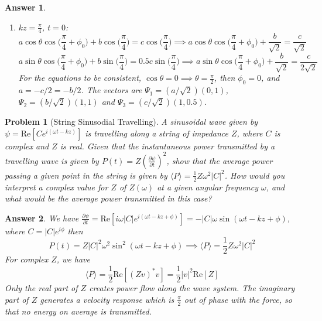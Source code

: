 \documentclass[a4paper]{article}
\newtheorem{ans}{Answer}[section]
\theoremstyle{new}
\newtheorem{qns}{Problem}[section]
\begin{document}
\begin{ans}
\begin{enumerate}[label=(\alph*)]
\begin{enumerate}[label=(\roman*)]
\item $kz=\frac{\pi}{4}$, $t=0$:
$$a\cos\theta\cos\bigg(\frac{\pi}{4}+\phi_0\bigg)+b\cos\bigg(\frac{\pi}{4}\bigg)=c\cos\bigg(\frac{\pi}{4}\bigg)\implies a\cos\theta\cos\bigg(\frac{\pi}{4}+\phi_0\bigg)+\frac{b}{\sqrt{2}}=\frac{c}{\sqrt{2}}$$
$$a\sin\theta\cos\bigg(\frac{\pi}{4}+\phi_0\bigg)+b\sin\bigg(\frac{\pi}{4}\bigg)=0.5c\sin\bigg(\frac{\pi}{4}\bigg)\implies a\sin\theta\cos\bigg(\frac{\pi}{4}+\phi_0\bigg)+\frac{b}{\sqrt{2}}=\frac{c}{2\sqrt{2}}$$
For the equations to be consistent, $\cos\theta=0\implies\theta=\frac{\pi}{2}$, then $\phi_0=0$, and $a=-c/2=-b/2$. The vectors are $\Psi_1=(a/\sqrt{2})(0,1)$, $\Psi_2=(b/\sqrt{2})(1,1)$ and $\Psi_3=(c/\sqrt{2})(1,0.5)$. 
\end{enumerate}
\end{enumerate}
\end{ans}
\begin{qns}[String Sinusodial Travelling]
A sinusoidal wave given by   $\psi=\text{Re}[Ce^{i(\omega t-kz)}]$ is travelling along a string of impedance $Z$, where $C$ is complex and $Z$ is real. Given that the instantaneous power transmitted by a travelling wave is given by $P(t)=Z(\frac{\partial\psi}{\partial t})^2$, show that the average power passing a given point in the string is given by $\langle P\rangle=\frac{1}{2}Z\omega^2|C|^2$. How would you interpret a complex value for $Z$ of $Z(\omega)$ at a given angular frequency $\omega$, and what would be the average power transmitted in this case?
\end{qns}
\begin{ans}
We have $\frac{\partial\psi}{\partial t}=\text{Re}[i\omega |C|e^{i(\omega t-kz+\phi)}]=-|C|\omega\sin(\omega t-kz+\phi)$, where $C=|C|e^{i\phi}$ then
$$P(t)=Z|C|^2\omega^2\sin^2(\omega t-kz+\phi)\implies \langle P\rangle=\frac{1}{2}Z\omega^2|C|^2$$
For complex $Z$, we have
$$\langle P\rangle=\frac{1}{2}\text{Re}[(Zv)^*v]=\frac{1}{2}|v|^2\text{Re}[Z]$$
Only the real part of $Z$ creates power flow along the wave system. The imaginary part of $Z$ generates a velocity response which is $\frac{\pi}{2}$ out of phase with the force, so that no energy on average is transmitted.
\end{ans}
\end{document}
